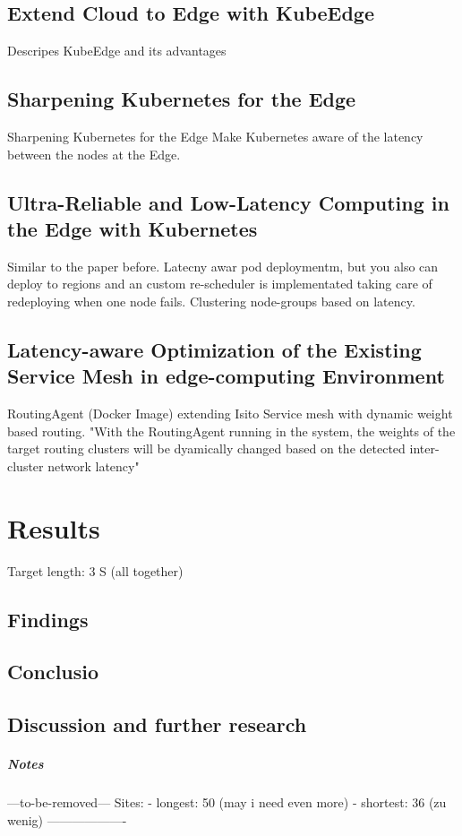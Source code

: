 \documentclass[MSC,Master,english]{twbook}%
\begin{document}
\section{Extend Cloud to Edge with KubeEdge}
Descripes KubeEdge and its advantages
\section{Sharpening Kubernetes for the Edge}
Sharpening Kubernetes for the Edge
Make Kubernetes aware of the latency between the nodes at the Edge.
\section{Ultra-Reliable and Low-Latency Computing in the Edge with Kubernetes}
Similar to the paper before. Latecny awar pod deploymentm, but you also can deploy to regions and an custom re-scheduler is implementated taking care of redeploying when one node fails.
Clustering node-groups based on latency.
\section{Latency-aware Optimization of the Existing Service Mesh in edge-computing Environment}
RoutingAgent (Docker Image) extending Isito Service mesh with dynamic weight based routing.
"With the RoutingAgent running in the system, the weights of the target routing clusters will be dyamically changed based on the detected inter-cluster network latency"

\chapter{Results}
\label{chap:results}

Target length: 3 S (all together)
\section{Findings}
\label{sec:findings}

\section{Conclusio}
\label{sec:conclusio}

\section{Discussion and further research}
\label{sec:discuss}

\paragraph{Notes}
---to-be-removed---
Sites:
- longest: 50 (may i need even more)
- shortest: 36 (zu wenig)
-------------------
\end{document}
